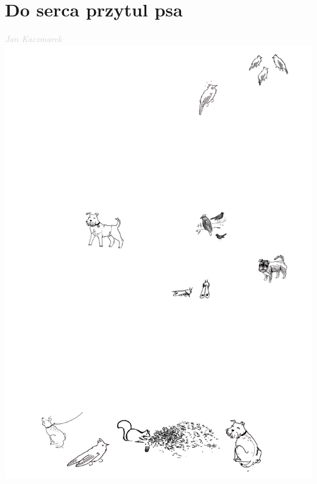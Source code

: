 \documentclass[a5paper, 10pt]{book}
\begin{document}
\section{Do serca przytul psa}\textcolor{lightgray}{\textit{Jan Kaczmarek~~~~~~~~~~~~~~~~~~~~~~}} \vspace*{-0.06\textheight}\\
\includegraphics[height=1.05\textheight]{images/do_serca_przytul_psa_gimp.png}\vspace*{-0.98\textheight}\\
\end{document}

